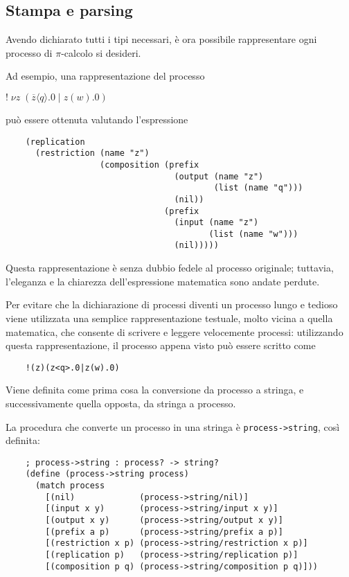 \subsection{Stampa e parsing}

Avendo dichiarato tutti i tipi necessari, \`e ora possibile rappresentare
ogni processo di $\pi$-calcolo si desideri.

Ad esempio, una rappresentazione del processo

\begin{pilisting}
$
    ! \; \nu z \; (
      \overline{z}\langle q\rangle.0 \; | \;
      z(w).0
    )
$
\end{pilisting}

pu\`o essere ottenuta valutando l'espressione

\begin{lstlisting}
    (replication
      (restriction (name "z")
                   (composition (prefix
                                  (output (name "z")
                                          (list (name "q")))
                                  (nil))
                                (prefix
                                  (input (name "z")
                                         (list (name "w")))
                                  (nil)))))
\end{lstlisting}

Questa rappresentazione \`e senza dubbio fedele al processo originale;
tuttavia, l'eleganza e la chiarezza dell'espressione matematica sono
andate perdute.

Per evitare che la dichiarazione di processi diventi un processo lungo
e tedioso viene utilizzata una semplice rappresentazione testuale,
molto vicina a quella matematica, che consente di scrivere e leggere
velocemente processi: utilizzando questa rappresentazione, il processo
appena visto pu\`o essere scritto come

\begin{lstlisting}
    !(z)(z<q>.0|z(w).0)
\end{lstlisting}

Viene definita come prima cosa la conversione da processo a stringa,
e successivamente quella opposta, da stringa a processo.

La procedura che converte un processo in una stringa \`e
\lstinline{process->string}, cos\`i definita:

\begin{lstlisting}
    ; process->string : process? -> string?
    (define (process->string process)
      (match process
        [(nil)             (process->string/nil)]
        [(input x y)       (process->string/input x y)]
        [(output x y)      (process->string/output x y)]
        [(prefix a p)      (process->string/prefix a p)]
        [(restriction x p) (process->string/restriction x p)]
        [(replication p)   (process->string/replication p)]
        [(composition p q) (process->string/composition p q)]))
\end{lstlisting}

